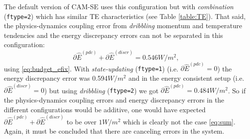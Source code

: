 \documentclass[draft,linenumbers]{agujournal}
\newcommand*{\gi}[1]{\widehat{#1}}
\begin{document}
The default version of CAM-SE uses this configuration but with {\em{combination}} ({\tt{ftype=2}}) which has similar TE characteristics (see Table \ref{table:TE}). That said, the physics-dynamics coupling error from {\em{dribbling}} momentum and temperature tendencies and the energy discrepancy errors can not be separated in this configuration:
\begin{equation}
\label{eq:sum}
\partial \gi{E}^{({pdc})}+\partial \gi{E}^{({discr})}=0.546W/m^2,
\end{equation}
using \eqref{eq:budget_efix}. With {\em{state-updating}} ({\tt{ftype=1}}) (i.e. $\partial \gi{E}^{({pdc})}=0$) the energy discrepancy error was 0.594$W/m^2$ and in the energy consistent setup (i.e. $\partial \gi{E}^{({discr})}=0$) but using {\em{dribbling}} ({\tt{ftype=2}}) we got $\partial \gi{E}^{({pdc})}=0.484W/m^2$. So if the physics-dynamics coupling errors and energy discrepancy errors in the different configurations would be additive, one would have expected $\partial \gi{E}^{({pdc})}+\partial \gi{E}^{({discr})}$ to be over $1W/m^2$ which is clearly not the case \eqref{eq:sum}. Again, it must be concluded that there are canceling errors in the system.


\end{document}
